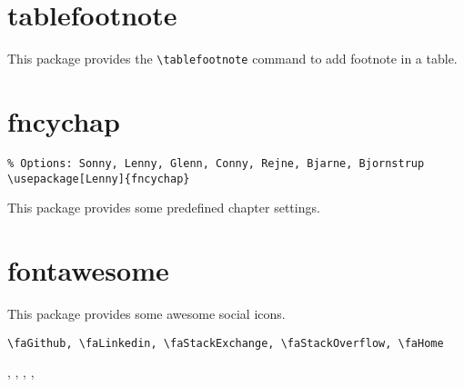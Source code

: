 \section{tablefootnote}
\label{sec:tablefootnote}

This package provides the \lstinline|\tablefootnote| command to add footnote in a table.


\section{fncychap}
\label{sec:fncychap}

\begin{lstlisting}
% Options: Sonny, Lenny, Glenn, Conny, Rejne, Bjarne, Bjornstrup
\usepackage[Lenny]{fncychap}

\end{lstlisting}

This package provides some predefined chapter settings.


\section{fontawesome}
\label{sec:fontawesome}

This package provides some awesome social icons.

\begin{lstlisting}
\faGithub, \faLinkedin, \faStackExchange, \faStackOverflow, \faHome
\end{lstlisting}

\faGithub, \faLinkedin, \faStackExchange, \faStackOverflow, \faHome
